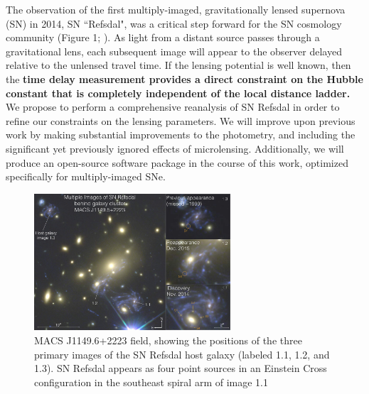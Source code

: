 \forceindent The observation of the first multiply-imaged, gravitationally lensed supernova (SN) in 2014, SN ``Refsdal", 
was a critical step forward for the SN cosmology community (Figure 1; \citet{Kelly:2015a}). As light from a distant
source passes through a gravitational lens, each subsequent image will appear to the observer delayed relative to the 
unlensed travel time. If the lensing potential is well known, then the {\bf time delay measurement  provides a direct constraint on
the Hubble constant that is completely independent of the local distance ladder.} We propose to perform a comprehensive 
reanalysis of SN Refsdal in order to refine our constraints on the lensing parameters. We will improve upon previous work by 
making substantial improvements to the photometry, and including the significant yet previously ignored effects of microlensing. 
Additionally, we will produce an open-source software package in the course of this work, optimized specifically for multiply-imaged SNe.\par

\begin{figure}[h]
\centering
\includegraphics[width=0.65\textwidth]{FIG/refsdal_rodney.pdf}
\caption{
MACS J1149.6+2223 field, showing the positions of the three primary
images of the SN Refsdal host galaxy (labeled 1.1, 1.2, and 1.3). SN
Refsdal appears as four point sources in an Einstein Cross
configuration in the southeast spiral arm of image 1.1 \citep{Rodney:2016}}
\end{figure}

